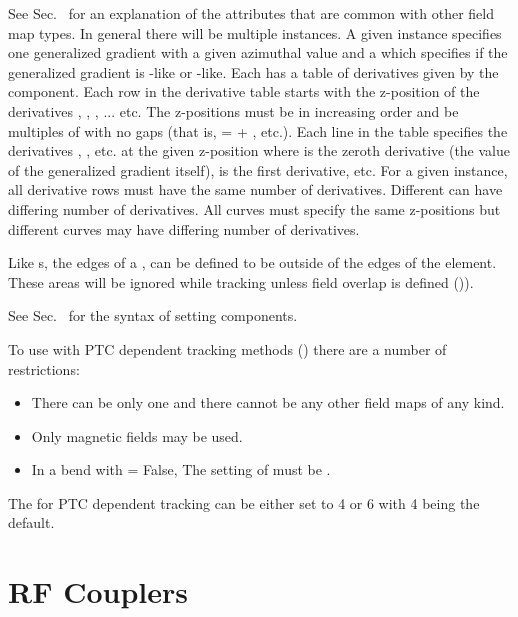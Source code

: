 See Sec.~ for an explanation of the attributes that are common with other field
map types. In general there will be multiple  instances.  A given  instance
specifies one generalized gradient with a given azimuthal  value and a  which
specifies if the generalized gradient is -like or -like. Each  has a table
of derivatives given by the  component. Each row in the derivative table starts with the
z-position of the derivatives , , , ... etc. The z-positions must be in
increasing order and be multiples of  with no gaps (that is,  =  + ,
etc.). Each line in the  table specifies the derivatives , , etc. at
the given z-position where  is the zeroth derivative (the value of the generalized gradient
itself),  is the first derivative, etc. For a given  instance, all derivative
rows must have the same number of derivatives. Different  can have differing number of
derivatives. All curves must specify the same z-positions but different curves may have differing
number of derivatives.

Like s, the edges of a , can be defined to be outside of the edges
of the element. These areas will be ignored while tracking unless field overlap is defined
()).

See Sec.~ for the syntax of setting  components.

To use with PTC dependent tracking methods () there are a number of restrictions:
  \begin{itemize}
%
\item
There can be only one  and there cannot be any other field maps of any kind.
%
\item
Only magnetic fields may be used.
%
\item
In a bend with  = False, The setting of  must be
.
  \end{itemize}

The  for PTC dependent tracking can be either set to 4 or 6 with 4 being the
default.

\section{RF Couplers}
\label{s:rf.coupler}

